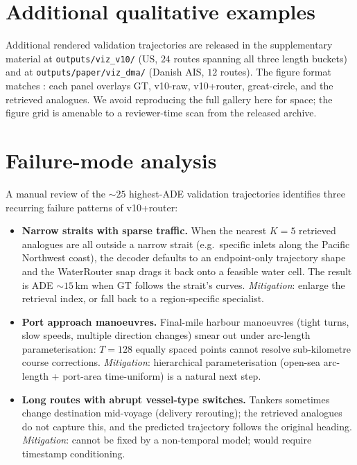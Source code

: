 \documentclass[11pt]{article}
\begin{document}
\section{Additional qualitative examples}
\label{sec:appendix-qual}

Additional rendered validation trajectories are released in the
supplementary material at
\texttt{outputs/viz\_v10/} (US, $24$ routes spanning all three length
buckets) and at \texttt{outputs/paper/viz\_dma/} (Danish AIS, $12$
routes). The figure format matches : each
panel overlays GT, v10-raw, v10+router, great-circle, and the
retrieved analogues. We avoid reproducing the full gallery here for
space; the figure grid is amenable to a reviewer-time scan from the
released archive.

\section{Failure-mode analysis}
\label{sec:appendix-failures}

A manual review of the $\sim$$25$ highest-ADE validation trajectories
identifies three recurring failure patterns of v10+router:

\begin{itemize}[leftmargin=*]
\item \textbf{Narrow straits with sparse traffic.} When the nearest
      $K=5$ retrieved analogues are all outside a narrow strait
      (e.g.\ specific inlets along the Pacific Northwest coast), the
      decoder defaults to an endpoint-only trajectory shape and the
      WaterRouter snap drags it back onto a feasible water cell. The
      result is ADE $\sim$$15$\,km when GT follows the strait's curves.
      \textit{Mitigation}: enlarge the retrieval index, or fall back to
      a region-specific specialist.
\item \textbf{Port approach manoeuvres.} Final-mile harbour
      manoeuvres (tight turns, slow speeds, multiple direction changes)
      smear out under arc-length parameterisation: $T{=}128$ equally
      spaced points cannot resolve sub-kilometre course corrections.
      \textit{Mitigation}: hierarchical parameterisation (open-sea
      arc-length + port-area time-uniform) is a natural next step.
\item \textbf{Long routes with abrupt vessel-type switches.} Tankers
      sometimes change destination mid-voyage (delivery rerouting);
      the retrieved analogues do not capture this, and the predicted
      trajectory follows the original heading. \textit{Mitigation}:
      cannot be fixed by a non-temporal model; would require timestamp
      conditioning.
\end{itemize}
\end{document}
